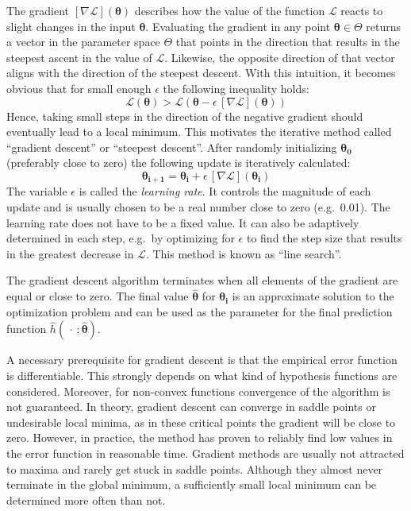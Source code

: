 The gradient $[\nabla\mathcal{L}](\boldsymbol{\theta})$ describes how the value of the function $\mathcal{L}$ reacts to slight changes in the input $\boldsymbol{\theta}$.
Evaluating the gradient in any point $\boldsymbol{\theta} \in \Theta$ returns a vector in the parameter space $\Theta$ that points in the direction that results in the steepest ascent in the value of $\mathcal{L}$.
Likewise, the opposite direction of that vector aligns with the direction of the steepest descent.
With this intuition, it becomes obvious that for small enough $\epsilon$ the following inequality holds:
\[
    \mathcal{L}(\boldsymbol{\theta}) > \mathcal{L}(\boldsymbol{\theta} - \epsilon\,[\nabla\mathcal{L}](\boldsymbol{\theta}))
\]
Hence, taking small steps in the direction of the negative gradient should eventually lead to a local minimum.
This motivates the iterative method called \enquote{gradient descent} or \enquote{steepest descent}.
After randomly initializing $\boldsymbol{\theta_0}$ (preferably close to zero) the following update is iteratively calculated:
\[
    \boldsymbol{\theta_{i+1}} = \boldsymbol{\theta_{i}} + \epsilon\,[\nabla\mathcal{L}](\boldsymbol{\theta_{i}})
\]
The variable $\epsilon$ is called the \textit{learning rate}.
It controls the magnitude of each update and is usually chosen to be a real number close to zero (e.g.\ 0.01). %
The learning rate does not have to be a fixed value.
It can also be adaptively determined in each step, e.g.\ by optimizing for $\epsilon$ to find the step size that results in the greatest decrease in $\mathcal{L}$.
This method is known as \enquote{line search}.

The gradient descent algorithm terminates when all elements of the gradient are equal or close to zero.
The final value $\boldsymbol{\hat{\theta}}$ for $\boldsymbol{\theta_{i}}$ is an approximate solution to the optimization problem and can be used as the parameter for the final prediction function $\hat{h}(\,\cdot\,; \boldsymbol{\hat{\theta}})$.

A necessary prerequisite for gradient descent is that the empirical error function is differentiable.
This strongly depends on what kind of hypothesis functions are considered.
Moreover, for non-convex functions convergence of the algorithm is not guaranteed.
In theory, gradient descent can converge in saddle points or undesirable local minima, as in these critical points the gradient will be close to zero.
However, in practice, the method has proven to reliably find low values in the error function in reasonable time.
Gradient methods are usually not attracted to maxima and rarely get stuck in saddle points.
Although they almost never terminate in the global minimum, a sufficiently small local minimum can be determined more often than not.


